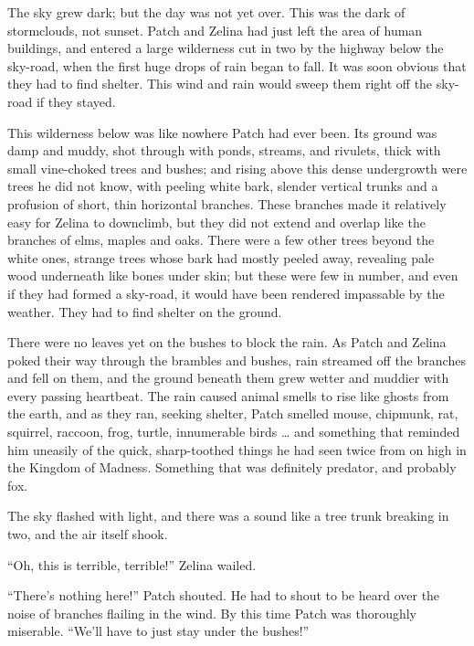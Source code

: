 \documentclass[ebook,oneside,openany,17pt]{memoir}
\newenvironment{tolerant}[1]{%
  \par\tolerance=#1\relax
}{%
  \par
}
\begin{document}
The sky grew dark; but the day was not yet over. This was the dark of
stormclouds, not sunset. Patch and Zelina had just left the area of
human buildings, and entered a large wilderness cut in two by the
highway below the sky-road, when the first huge drops of rain began to
fall. It was soon obvious that they had to find shelter. This wind and
rain would sweep them right off the sky-road if they stayed.

\begin{tolerant}{2000}
This wilderness below was like nowhere Patch had ever been. Its ground
was damp and muddy, shot through with ponds, streams, and rivulets,
thick with small vine-choked trees and bushes; and rising above this
dense undergrowth were trees he did not know, with peeling white bark,
slender vertical trunks and a profusion of short, thin horizontal
branches. These branches made it relatively easy for Zelina to
downclimb, but they did not extend and overlap like the branches of
elms, maples and oaks. There were a few other trees beyond the white
ones, strange trees whose bark had mostly peeled away, revealing pale
wood underneath like bones under skin; but these were few in number,
and even if they had formed a sky-road, it would have been rendered
impassable by the weather. They had to find shelter on the ground.
\end{tolerant}

\begin{tolerant}{2000}
There were no leaves yet on the bushes to block the rain. As Patch and
Zelina poked their way through the brambles and bushes, rain streamed
off the branches and fell on them, and the ground beneath them grew
wetter and muddier with every passing heartbeat. The rain caused
animal smells to rise like ghosts from the earth, and as they ran,
seeking shelter, Patch smelled mouse, chipmunk, rat, squirrel,
raccoon, frog, turtle, innumerable birds … and something that reminded
him uneasily of the quick, sharp-toothed things he had seen twice from
on high in the Kingdom of Madness. Something that was definitely
predator, and probably fox.
\end{tolerant}

The sky flashed with light, and there was a sound like a tree trunk
breaking in two, and the air itself shook.

“Oh, this is terrible, terrible!” Zelina wailed.

“There’s nothing here!” Patch shouted. He had to shout to be heard
over the noise of branches flailing in the wind. By this time Patch
was thoroughly miserable. “We’ll have to just stay under the bushes!”
\end{document}
